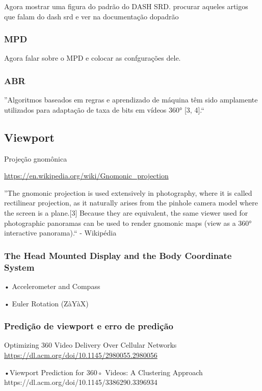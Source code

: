 Agora mostrar uma figura do padrão do DASH SRD. procurar aqueles artigos que falam do dash srd e ver na documentação dopadrão

\subsubsection{MPD}

Agora falar sobre o MPD e colocar as confgurações dele.

\subsubsection{ABR}

''Algoritmos baseados em regras e aprendizado de máquina têm sido amplamente utilizados para adaptação de taxa de bits em vídeos 360° [3, 4].``

\subsection{Viewport}

Projeção gnomônica

\url{https://en.wikipedia.org/wiki/Gnomonic_projection}

''The gnomonic projection is used extensively in photography, where it is called rectilinear projection, as it naturally arises from the pinhole camera model where the screen is a plane.[3] Because they are equivalent, the same viewer used for photographic panoramas can be used to render gnomonic maps (view as a 360° interactive panorama).`` - Wikipédia

\subsubsection{The Head Mounted Display and the Body Coordinate System}

•	Accelerometer and Compass

•	Euler Rotation (ZàYàX)

\subsubsection{Predição de viewport e erro de predição}

Optimizing 360 Video Delivery Over Cellular Networks
\url{https://dl.acm.org/doi/10.1145/2980055.2980056}

•Viewport Prediction for 360◦ Videos: A Clustering Approach
https://dl.acm.org/doi/10.1145/3386290.3396934

